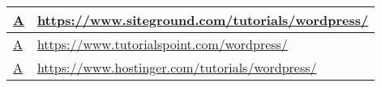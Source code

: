 \begin{table}[ht!]
{\begin{tabular}{|l|p{20cm}|}
  \href{https://web.archive.org/web/20190213173658/https://www.siteground.com/tutorials/wordpress/}{A}                                                         & \href{https://www.siteground.com/tutorials/wordpress/}{https://www.siteground.com/tutorials/wordpress/}                                                   \\ \hline
  \href{https://web.archive.org/web/20190213173717/https://www.tutorialspoint.com/wordpress/}{A}                                                               & \href{https://www.tutorialspoint.com/wordpress/}{https://www.tutorialspoint.com/wordpress/}                                                   \\ \hline
  \href{https://web.archive.org/web/20190213173749/https://www.hostinger.com/tutorials/wordpress/}{A}                                                          & \href{https://www.hostinger.com/tutorials/wordpress/}{https://www.hostinger.com/tutorials/wordpress/}                                                   \\ \hline
\end{tabular}
}
\end{table}

